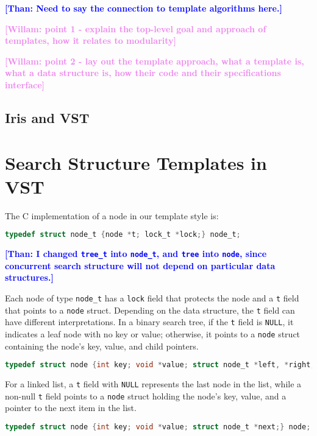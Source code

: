 \documentclass[a4paper,UKenglish,cleveref, autoref, thm-restate]{lipics-v2021}
\newcommand{\than}[1]{\textbf{\textcolor{blue}{[Than: #1]}}}
\newcommand{\wm}[1]{\textbf{\textcolor{violet}{[Willam: #1]}}}
\begin{document}
\than{Need to say the connection to template algorithms here.} 

\wm{point 1 - explain the top-level goal and approach of templates, how it relates to modularity}

\wm{point 2 - lay out the template approach, what a template is, what a data structure is, how their code and their specifications interface}

\subsection{Iris and VST}


\section{Search Structure Templates in VST}
The C implementation of a node in our template style is:
\begin{lstlisting}[language = C, backgroundcolor=\color{white}, basicstyle=\ttfamily\footnotesize]
typedef struct node_t {node *t; lock_t *lock;} node_t;
\end{lstlisting}
\than{I changed \lstinline{tree_t} into \lstinline{node_t}, and \lstinline{tree} into \lstinline{node}, since concurrent search structure will not depend on particular data structures.} 

Each node of type \lstinline{node_t} has a \lstinline{lock} field that protects the node and a \lstinline{t} field that points to a \lstinline{node} struct. Depending on the data structure, the \lstinline{t} field can have different interpretations. In a binary search tree, if the \lstinline{t} field is \lstinline{NULL}, it indicates a leaf node with no key or value; otherwise, it points to a \lstinline{node} struct containing the node's key, value, and child pointers. 
\begin{lstlisting}[language = C, backgroundcolor=\color{white}, basicstyle=\ttfamily\footnotesize]
typedef struct node {int key; void *value; struct node_t *left, *right;} node;
\end{lstlisting}

For a linked list, a \lstinline{t} field with \lstinline{NULL} represents the last node in the list, while a non-null \lstinline{t} field points to a \lstinline{node} struct holding the node's key, value, and a pointer to the next item in the list. 

\begin{lstlisting}[language = C, backgroundcolor=\color{white}, basicstyle=\ttfamily\footnotesize]
typedef struct node {int key; void *value; struct node_t *next;} node;
\end{lstlisting}
\end{document}
